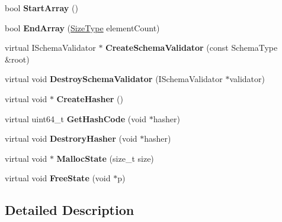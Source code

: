 \begin{DoxyCompactItemize}
\mbox{\label{class_generic_schema_validator_aba13751f802531ed8cbd850778ea993c}} 
bool {\bfseries Start\+Array} ()
\item 
\mbox{\label{class_generic_schema_validator_a67b501f0f65d40e0086ca8216882b34f}} 
bool {\bfseries End\+Array} (\hyperlink{rapidjson_8h_a5ed6e6e67250fadbd041127e6386dcb5}{Size\+Type} element\+Count)
\item 
\mbox{\label{class_generic_schema_validator_af074f9c8f2cfc07e1b3d3f8862e7ef11}} 
virtual I\+Schema\+Validator $\ast$ {\bfseries Create\+Schema\+Validator} (const Schema\+Type \&root)
\item 
\mbox{\label{class_generic_schema_validator_ae24fa298e328f1fd7dda2ef6267156d2}} 
virtual void {\bfseries Destroy\+Schema\+Validator} (I\+Schema\+Validator $\ast$validator)
\item 
\mbox{\label{class_generic_schema_validator_abc377481583ca2095fb784be88887faa}} 
virtual void $\ast$ {\bfseries Create\+Hasher} ()
\item 
\mbox{\label{class_generic_schema_validator_ac01c45982a1f512e1ca06fe5544b0c0f}} 
virtual uint64\+\_\+t {\bfseries Get\+Hash\+Code} (void $\ast$hasher)
\item 
\mbox{\label{class_generic_schema_validator_a007eef58be575dc562543d069ddd2710}} 
virtual void {\bfseries Destrory\+Hasher} (void $\ast$hasher)
\item 
\mbox{\label{class_generic_schema_validator_a7c999dfb3118aaa08495d60eee6d3732}} 
virtual void $\ast$ {\bfseries Malloc\+State} (size\+\_\+t size)
\item 
\mbox{\label{class_generic_schema_validator_a4e250737a411af2969a9e585a7da4187}} 
virtual void {\bfseries Free\+State} (void $\ast$p)
\end{DoxyCompactItemize}


\subsection{Detailed Description}
